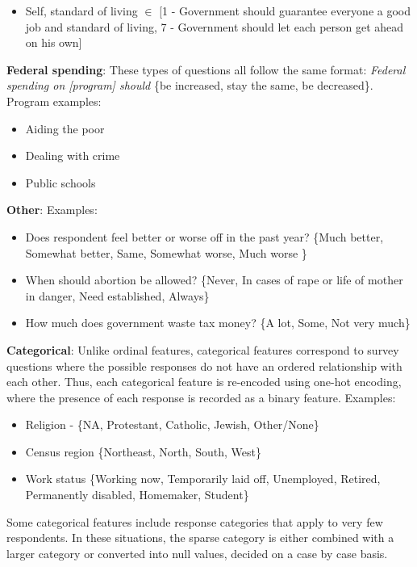 \documentclass{article}
\begin{document}
\begin{enumerate}
{\begin{itemize}
{\begin{itemize}
					\item{Self, standard of living $\in$ [1 - Government should guarantee everyone a good job and standard of living, 7 - Government should let each person get ahead on his own]}
				\end{itemize}
				\item{\textbf{Federal spending}: These types of questions all follow the same format: \textit{Federal spending on [program] should} \{be increased, stay the same, be decreased\}.} Program examples:
					\begin{itemize}
						\item{Aiding the poor}
						\item{Dealing with crime}
						\item{Public schools}
					\end{itemize}
				\item{\textbf{Other}: Examples:}
					\begin{itemize}
						\item{Does respondent feel better or worse off in the past year? \{Much better, Somewhat better, Same, Somewhat worse, Much worse \}}
						\item{When should abortion be allowed? \{Never, In cases of rape or life of mother in danger, Need established, Always\}}
						\item{How much does government waste tax money? \{A lot, Some, Not very much\}}
					\end{itemize}
			}
			\end{itemize}
			\item{\textbf{Categorical}: Unlike ordinal features, categorical features correspond to survey questions where the possible responses do not have an ordered relationship with each other. Thus, each categorical feature is re-encoded using one-hot encoding, where the presence of each response is recorded as a binary feature. Examples:
				\begin{itemize}
					\item{Religion - \{NA, Protestant, Catholic, Jewish, Other/None\}}
					\item{Census region \{Northeast, North, South, West\}}
					\item{Work status \{Working now, Temporarily laid off, Unemployed, Retired, Permanently disabled, Homemaker, Student\}}
				\end{itemize}
			Some categorical features include response categories that apply to very few respondents. In these situations, the sparse category is either combined with a larger category or converted into null values, decided on a case by case basis.
}}
\end{enumerate}
\end{document}
